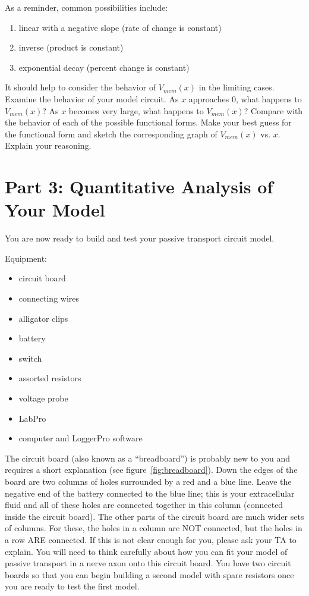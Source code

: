 As a reminder, common possibilities include:
\begin{enumerate}
\itemsep-0.2em
\item linear with a negative slope (rate of change is constant)
\item inverse (product is constant)
\item exponential decay (percent change is constant)
\end{enumerate}
It should help to consider the behavior of $V_{mem}(x)$ in the limiting cases.
Examine the behavior of your model circuit.
As $x$ approaches $0$, what happens to $V_{mem}(x)$?
As $x$ becomes very large, what happens to $V_{mem}(x)$?
Compare with the behavior of each of the possible functional forms.
Make your best guess for the functional form and sketch the corresponding graph of $V_{mem}(x)$ vs. $x$.
Explain your reasoning.

\section*{Part 3: Quantitative Analysis of Your Model}
You are now ready to build and test your passive transport circuit model.
\par 
Equipment:
\begin{itemize}
	\itemsep-0.2em
	\item circuit board
	\item connecting wires
	\item alligator clips
	\item battery 
	\item switch
	\item assorted resistors
	\item voltage probe
	\item LabPro
	\item computer and LoggerPro software
\end{itemize}
The circuit board (also known as a ``breadboard'') is probably new to you and requires a short explanation (see figure~\ref{fig:breadboard}).
Down the edges of the board are two columns of holes surrounded by a red and a blue line.
Leave the negative end of the battery connected to the blue line; this is your extracellular fluid and all of these holes are connected together in this column (connected inside the circuit board).
The other parts of the circuit board are much wider sets of columns.
For these, the holes in a column are NOT connected, but the holes in a row ARE connected.
If this is not clear enough for you, please ask your TA to explain.
You will need to think carefully about how you can fit your model of passive transport in a nerve axon onto this circuit board.
You have two circuit boards so that you can begin building a second model with spare resistors once you are ready to test the first model.
\par 

